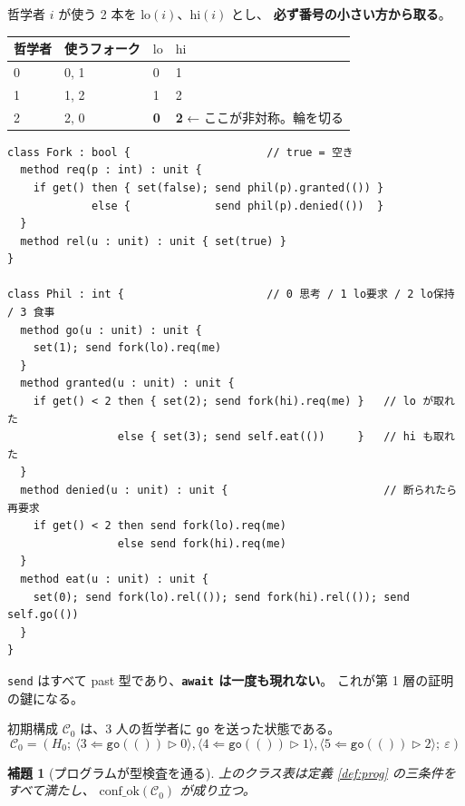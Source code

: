 \documentclass[11pt,a4paper]{ltjsarticle}
\newtheorem{lemma}[theorem]{補題}
\theoremstyle{definition}
\theoremstyle{remark}
\newcommand{\confok}{\mathrm{conf\_ok}}
\begin{document}
哲学者 $i$ が使う 2 本を $\mathrm{lo}(i)$、$\mathrm{hi}(i)$ とし、
\textbf{必ず番号の小さい方から取る}。

\begin{center}
\begin{tabular}{@{}llll@{}}
\toprule
哲学者 & 使うフォーク & $\mathrm{lo}$ & $\mathrm{hi}$ \\
\midrule
0 & 0, 1 & 0 & 1 \\
1 & 1, 2 & 1 & 2 \\
2 & 2, 0 & \textbf{0} & \textbf{2} \quad ← ここが非対称。輪を切る \\
\bottomrule
\end{tabular}
\end{center}

\begin{lstlisting}[language=AIPL]
class Fork : bool {                     // true = 空き
  method req(p : int) : unit {
    if get() then { set(false); send phil(p).granted(()) }
             else {             send phil(p).denied(())  }
  }
  method rel(u : unit) : unit { set(true) }
}

class Phil : int {                      // 0 思考 / 1 lo要求 / 2 lo保持 / 3 食事
  method go(u : unit) : unit {
    set(1); send fork(lo).req(me)
  }
  method granted(u : unit) : unit {
    if get() < 2 then { set(2); send fork(hi).req(me) }   // lo が取れた
                 else { set(3); send self.eat(())     }   // hi も取れた
  }
  method denied(u : unit) : unit {                        // 断られたら再要求
    if get() < 2 then send fork(lo).req(me)
                 else send fork(hi).req(me)
  }
  method eat(u : unit) : unit {
    set(0); send fork(lo).rel(()); send fork(hi).rel(()); send self.go(())
  }
}
\end{lstlisting}

\texttt{send} はすべて past 型であり、\textbf{\texttt{await} は一度も現れない}。
これが第 1 層の証明の鍵になる。

初期構成 $\mathcal{C}_0$ は、3 人の哲学者に \texttt{go} を送った状態である。
\[
\mathcal{C}_0 = (H_0;\
  \langle 3 \Leftarrow \mathtt{go}(()) \rhd 0\rangle,
  \langle 4 \Leftarrow \mathtt{go}(()) \rhd 1\rangle,
  \langle 5 \Leftarrow \mathtt{go}(()) \rhd 2\rangle;\
  \varepsilon)
\]

\begin{lemma}[プログラムが型検査を通る]
\label{lem:dpty}
上のクラス表は定義 \ref{def:prog} の三条件をすべて満たし、
$\confok(\mathcal{C}_0)$ が成り立つ。
\end{lemma}
\end{document}
